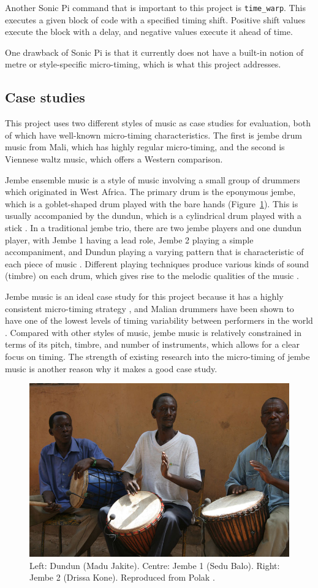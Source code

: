 \documentclass[12pt,twoside,openright]{report}
\begin{document}
Another Sonic Pi command that is important to this project is \verb'time_warp'. This executes a given block of code with a specified timing shift. Positive shift values execute the block with a delay, and negative values execute it ahead of time.

One drawback of Sonic Pi is that it currently does not have a built-in notion of
metre or style-specific micro-timing, which is what this project addresses.


\subsection{Case studies} \label{case_studies}

This project uses two different styles of music as case studies for evaluation,
both of which have well-known micro-timing characteristics. The first is jembe
drum music from Mali, which has highly regular micro-timing, and the second is
Viennese waltz music, which offers a Western comparison.

Jembe ensemble music is a style of music involving a small group of drummers
which originated in West Africa. The primary drum is the eponymous jembe, which
is a goblet-shaped drum played with the bare hands (Figure~\ref{fig:jembe_photo}). This is usually accompanied
by the dundun, which is a cylindrical drum played with a stick \cite{polak2010}. In a
traditional jembe trio, there are two jembe players and one dundun player, with
Jembe 1 having a lead role, Jembe 2 playing a simple accompaniment, and Dundun
playing a varying pattern that is characteristic of each piece of music
\cite{jacoby2021}. Different playing techniques produce various kinds of sound
(timbre) on each drum, which gives rise to the melodic qualities of the music
\cite{polak2010}.

Jembe music is an ideal case study for this project because it has a highly
consistent micro-timing strategy \cite{polak2010}, and Malian drummers have been shown to
have one of the lowest levels of timing variability between performers in the
world \cite{clayton2020}. Compared with other styles of music, jembe music is
relatively constrained in terms of its pitch, timbre, and number of instruments,
which allows for a clear focus on timing. The strength of existing research \cite{polak2010,london2017,jacoby2021} into the micro-timing of jembe music is another reason why it makes a good case study.

\begin{figure}[ht]
    \centering
    \includegraphics[width=0.5\linewidth]{figures/polak_ex1.jpg}
    \caption{Left: Dundun (Madu Jakite). Centre: Jembe 1 (Sedu Balo). Right: Jembe 2 (Drissa Kone). Reproduced from Polak \cite{polak2010}.}
    \label{fig:jembe_photo}
\end{figure}
\end{document}
